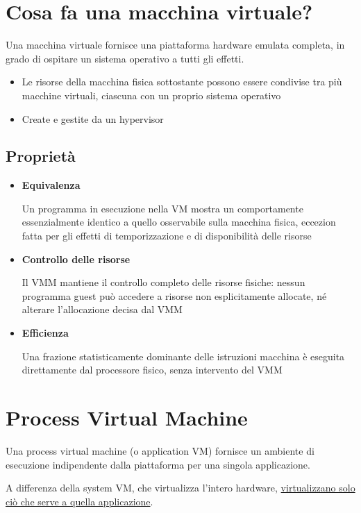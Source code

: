 \section{Cosa fa una macchina virtuale?}
Una macchina virtuale fornisce una piattaforma hardware emulata completa, in grado di ospitare un sistema operativo a tutti gli effetti.
\begin{itemize}
    \item Le risorse della macchina fisica sottostante possono essere condivise tra più macchine virtuali, ciascuna con un proprio sistema operativo
    \item Create e gestite da un hypervisor
\end{itemize}

\subsection{Proprietà}
\begin{itemize}
    \item \textbf{Equivalenza}

    Un programma in esecuzione nella VM mostra un comportamente essenzialmente identico a quello osservabile sulla macchina fisica, eccezion fatta per gli effetti di temporizzazione e di disponibilità delle risorse

    \item \textbf{Controllo delle risorse}

    Il VMM mantiene il controllo completo delle risorse fisiche: nessun programma guest può accedere a risorse non esplicitamente allocate, né alterare l'allocazione decisa dal VMM

    \item \textbf{Efficienza}
    
    Una frazione statisticamente dominante delle istruzioni macchina è eseguita direttamente dal processore fisico, senza intervento del VMM
\end{itemize}

\section{Process Virtual Machine}
Una process virtual machine (o application VM) fornisce un ambiente di esecuzione indipendente dalla piattaforma per una singola applicazione.

A differenza della system VM, che virtualizza l'intero hardware, \uline{virtualizzano solo ciò che serve a quella applicazione}.

